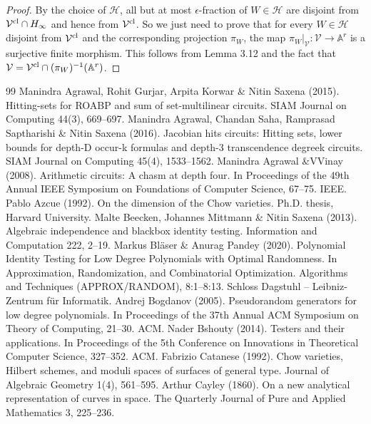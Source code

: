 \documentclass[10pt,a4paper]{article}
\newcommand{\Aspace}{\mathbb A}
\begin{document}
\begin{proof}
By the choice of $\mathcal H$, all but at most $\epsilon$-fraction of $W\in\mathcal H$ are disjoint from $\mathcal V^{\rm cl}\cap H_\infty$ and hence from $\mathcal V^{\rm cl}$. So we just need to prove that for every $W\in\mathcal H$ disjoint from $\mathcal V^{\rm cl}$ and the corresponding projection $\pi_W$, the map $\pi_W|_{\mathcal V}:\mathcal V\to\Aspace^r$ is a surjective finite morphism. This follows from Lemma 3.12 and the fact that $\mathcal V=\mathcal V^{\rm cl}\cap(\pi_W)^{-1}(\Aspace^r)$.
\end{proof}

\begin{thebibliography}{99}
 Manindra Agrawal, Rohit Gurjar, Arpita Korwar \& Nitin Saxena (2015). Hitting-sets for ROABP and sum of set-multilinear circuits. SIAM Journal on Computing 44(3), 669–697.
 Manindra Agrawal, Chandan Saha, Ramprasad Saptharishi \& Nitin Saxena (2016). Jacobian hits circuits: Hitting sets, lower bounds for depth-D occur-k formulas and depth-3 transcendence degreek circuits. SIAM Journal on Computing 45(4), 1533–1562.
 Manindra Agrawal \&VVinay (2008). Arithmetic circuits: A chasm at depth four. In Proceedings of the 49th Annual IEEE Symposium on Foundations of Computer Science, 67–75. IEEE.
 Pablo Azcue (1992). On the dimension of the Chow varieties. Ph.D. thesis, Harvard University.
 Malte Beecken, Johannes Mittmann \& Nitin Saxena (2013). Algebraic independence and blackbox identity testing. Information and Computation 222, 2–19.
 Markus Bläser \& Anurag Pandey (2020). Polynomial Identity Testing for Low Degree Polynomials with Optimal Randomness. In Approximation, Randomization, and Combinatorial Optimization. Algorithms and Techniques (APPROX/RANDOM), 8:1–8:13. Schloss Dagstuhl – Leibniz-Zentrum für Informatik.
 Andrej Bogdanov (2005). Pseudorandom generators for low degree polynomials. In Proceedings of the 37th Annual ACM Symposium on Theory of Computing, 21–30. ACM.
 Nader Bshouty (2014). Testers and their applications. In Proceedings of the 5th Conference on Innovations in Theoretical Computer Science, 327–352. ACM.
 Fabrizio Catanese (1992). Chow varieties, Hilbert schemes, and moduli spaces of surfaces of general type. Journal of Algebraic Geometry 1(4), 561–595.
 Arthur Cayley (1860). On a new analytical representation of curves in space. The Quarterly Journal of Pure and Applied Mathematics 3, 225–236.

\end{thebibliography}
\end{document}
